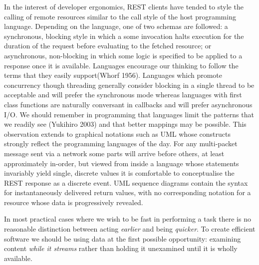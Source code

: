 \documentclass[12pt, ]{article}
\begin{document}
In the interest of developer ergonomics, REST clients have tended to
style the calling of remote resources similar to the call style of the
host programming language. Depending on the language, one of two schemas
are followed: a synchronous, blocking style in which a some invocation
halts execution for the duration of the request before evaluating to the
fetched resource; or asynchronous, non-blocking in which some logic is
specified to be applied to a response once it is available. Languages
encourage our thinking to follow the terms that they easily
support(Whorf 1956). Languages which promote concurrency though
threading generally consider blocking in a single thread to be
acceptable and will prefer the synchronous mode whereas languages with
first class functions are naturally conversant in callbacks and will
prefer asynchronous I/O. We should remember in programming that
languages limit the patterns that we readily see (Yukihiro 2003) and
that better mappings may be possible. This observation extends to
graphical notations such as UML whose constructs strongly reflect the
programming languages of the day. For any multi-packet message sent via
a network some parts will arrive before others, at least approximately
in-order, but viewed from inside a language whose statements invariably
yield single, discrete values it is comfortable to conceptualise the
REST response as a discrete event. UML sequence diagrams contain the
syntax for instantaneously delivered return values, with no
corresponding notation for a resource whose data is progressively
revealed.

In most practical cases where we wish to be fast in performing a task
there is no reasonable distinction between acting \emph{earlier} and
being \emph{quicker}. To create efficient software we should be using
data at the first possible opportunity: examining content \emph{while it
streams} rather than holding it unexamined until it is wholly available.
\end{document}
